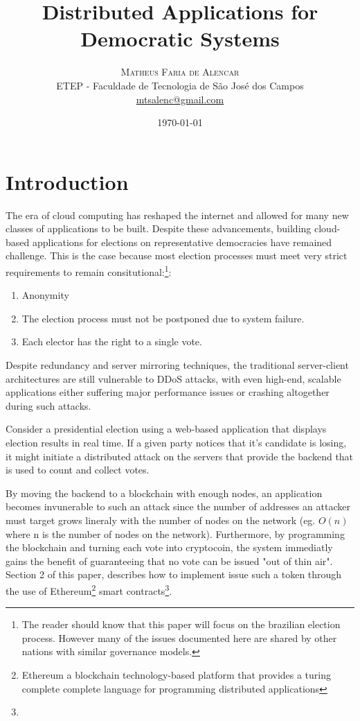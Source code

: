 \documentclass[twoside]{article}
\title{Distributed Applications for Democratic Systems} %
\author{%
\textsc{Matheus Faria de Alencar} \\[1ex] %
\normalsize ETEP - Faculdade de Tecnologia de S\~ao Jos\'e dos Campos \\ %
\normalsize \href{mailto:mtsalenc@gmail.com}{mtsalenc@gmail.com} %
}
\date{\today} %
\begin{document}
\maketitle


\section{Introduction}

The era of cloud computing has reshaped the internet and allowed for many new classes of applications to be built. Despite these advancements, building cloud-based applications for elections on representative democracies have remained challenge. This is the case because most election processes must meet very strict requirements to remain consitutional:\footnote{The reader should know that this paper will focus on the brazilian election process. However many of the issues documented here are shared by other nations with similar governance models.}:
\begin{enumerate}
\item Anonymity
\item The election process must not be postponed due to system failure.
\item Each elector has the right to a single vote.
\end{enumerate}

Despite redundancy and server mirroring techniques, the traditional server-client architectures are still vulnerable to DDoS attacks, with even high-end, scalable applications either suffering major performance issues or crashing altogether during such attacks.

Consider a presidential election using a web-based application that displays election results in real time. If a given party notices that it's candidate is losing, it might initiate a distributed attack on the servers that provide the backend that is used to count and collect votes. 

By moving the backend to a blockchain with enough nodes, an application becomes invunerable to such an attack since the number of addresses an attacker must target grows lineraly with the number of nodes on the network (eg. $O(n)$ where n is the number of nodes on the network). Furthermore, by  programming the blockchain and turning each vote into cryptocoin, the system immediatly gains the benefit of guaranteeing that no vote can be issued "out of thin air". Section 2 of this paper, describes how to implement issue such a token through the use of Ethereum\footnote{Ethereum a blockchain technology-based platform that provides a turing complete complete language for programming distributed applications} smart contracts\footnote{}.
\end{document}
